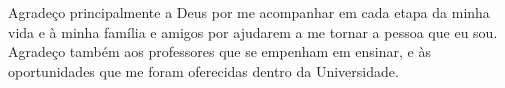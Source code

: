 \begin{agradecimentos}
Agradeço principalmente a Deus por me acompanhar em cada etapa da minha vida e à minha família e amigos por ajudarem a me tornar a pessoa que eu sou. Agradeço também aos professores que se empenham em ensinar, e às oportunidades que me foram oferecidas dentro da Universidade. 
\end{agradecimentos}